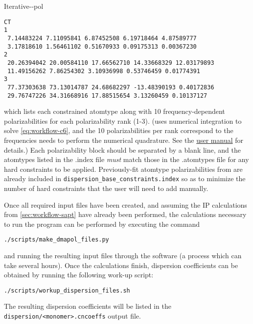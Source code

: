 \begin{subsubsection}{Iterative-\dma-pol}
\begin{enumerate}
\begin{minipage}{\linewidth}
\begin{lstlisting}
CT
1 
 7.14483224 7.11095841 6.87452508 6.19718464 4.87589777 
 3.17818610 1.56461102 0.51670933 0.09175313 0.00367230 
2 
 20.26394042 20.00584110 17.66562710 14.33668329 12.03179893 
 11.49156262 7.86254302 3.10936998 0.53746459 0.01774391 
3 
 77.37303638 73.13014787 24.68682297 -13.48390193 0.40172836 
 29.76747226 34.31668916 17.88515654 3.13260459 0.10137127

\end{lstlisting}
\end{minipage}
which lists each constrained atomtype along with 10 frequency-dependent
polarizabilities for each polarizability rank (1-3). (\camcasp uses numerical
integration to solve \cref{eq:workflow-c6}, and the 10 polarizabilities per
rank correspond to the frequencies \camcasp needs to perform the numerical
quadrature. See the
\href{http://www-stone.ch.cam.ac.uk/programs/camcasp.html}{\camcasp user
manual} for details.) Each polarizability block should be separated by a blank
line, and the atomtypes listed in the .index file \emph{must} match those in
the .atomtypes file for any hard constraints to be applied. 
Previously-fit atomtype polarizabilities from  are already included in 
\verb|dispersion_base_constraints.index| so as to minimize the number of hard
constraints that the user will need to add manually.
\end{enumerate}

Once all required input files have been created, and assuming the IP calculations
from \cref{sec:workflow-sapt} have already been performed,
the \camcasp calculations necessary to run the \idma program
can be performed by executing the command 
%
\begin{lstlisting}
./scripts/make_dmapol_files.py
\end{lstlisting}
%
and running the resulting input files through the \camcasp software (a process
which can take several hours).
Once the \camcasp calculations finish, dispersion coefficients can be obtained by running the following
work-up script:
%
\begin{lstlisting}
./scripts/workup_dispersion_files.sh
\end{lstlisting}
%
The resulting dispersion coefficients will be listed in the
\verb|dispersion/<monomer>.cncoeffs| output file.


\end{subsubsection}
